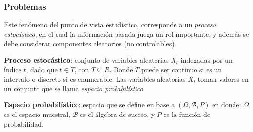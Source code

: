 \begin{frame}
\frametitle{Problemas}
Este fenómeno del punto de vista estadístico, corresponde a un \emph{proceso
estocástico}, en el cual la información pasada juega un rol importante, y
además se debe considerar componentes aleatorios (no controlables).

\textbf{Proceso estocástico}: conjunto de variables aleatorias $X_t$ indexadas
por un índice $t$, dado que $t \in T$, con $T \subseteq R$. Donde $T$ puede ser
continuo si es un intervalo o discreto si es enumerable. Las variables
aleatorias $X_t$ toman valores en un conjunto que se llama \emph{espacio
probabilístico}.

\textbf{Espacio probabilístico}: espacio que se define en base a $(\Omega,
\mathcal B, P)$ en donde: $\Omega$ es el espacio muestral, $\mathcal B$ es el
álgebra de suceso, y $P$ es la función de probabilidad.

\end{frame}
